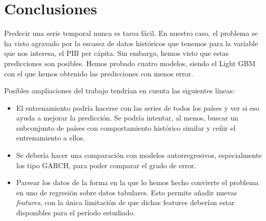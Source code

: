 \documentclass[12pt]{article}
\begin{document}
\begin{figure}[H]
\end{figure}
 

\section{Conclusiones}

Predecir una serie temporal nunca es tarea fácil. En nuestro caso, el problema se ha visto agravado por la escasez de datos históricos que tenemos para la variable que nos interesa, el PIB per cápita. Sin embargo, hemos visto que estas predicciones son posibles. Hemos probado cuatro modelos, siendo el Light GBM con el que hemos obtenido las predicciones con menos error.

Posibles ampliaciones del trabajo tendrían en cuenta las siguientes líneas:
\begin{itemize}
    \item El entrenamiento podría hacerse con las series de todos los países y ver si eso ayuda a mejorar la predicción. Se podría intentar, al menos, buscar un subconjunto de países con comportamiento histórico similar y ceñir el entrenamiento a ellos.
    \item Se debería hacer una comparación con modelos autorregresivos, especialmente los tipo GARCH, para poder comparar el grado de error.
    \item Parsear los datos de la forma en la que lo hemos hecho convierte el problema en uno de regresión sobre datos tabulares. Esto permite añadir nuevas \textit{features}, con la única limitación de que dichas features deberían estar disponibles para el período estudiado.
\end{itemize}
\end{document}
